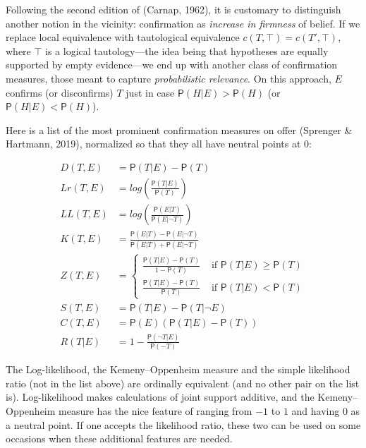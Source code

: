 \documentclass[
  10pt,
  dvipsnames,enabledeprecatedfontcommands]{scrartcl}
\newcommand{\n}{\neg}
\newcommand{\pr}[1]{\mathsf{P}(#1)}
\begin{document}
Following the second edition of (Carnap, 1962), it is customary to
distinguish another notion in the vicinity: confirmation as
\textit{increase in firmness} of belief. If we replace local equivalence
with tautological equivalence \(c(T, \top) = c(T', \top)\), where
\(\top\) is a logical tautology---the idea being that hypotheses are
equally supported by empty evidence---we end up with another class of
confirmation measures, those meant to capture
\emph{probabilistic relevance}. On this approach, \(E\) confirms (or
disconfirms) \(T\) just in case \(\pr{H \vert E} > \pr{H}\) (or
\(\pr{H \vert E} < \pr{H}\)).

Here is a list of the most prominent confirmation measures on offer
(Sprenger \& Hartmann, 2019), normalized so that they all have neutral
points at 0:

\begin{align}
\tag{Difference}  D(T,E) & = \pr{T\vert E} - \pr{T}\\
\tag{Log-ratio}  Lr(T,E) &  = log\left(\frac{\pr{T\vert E}}{\pr{T}} \right) \\
\tag{Log-likelihood}   LL(T,E) & = log\left(\frac{\pr{E \vert T}}{\pr{E \vert \n T}} \right)\\
\tag{Kemeny-Oppenheim}  K(T,E) & = \frac{\pr{E\vert T} - \pr{E \vert \n T}}{\pr{E \vert T} + \pr{E \vert \n T}} \\
\tag{Generalized entailment}  Z(T,E) & = \begin{cases}
\frac{\pr{T\vert E} - \pr{T}}{1-\pr{T}} & \mbox{ if } \pr{T \vert E} \geq \pr{T}\\
\frac{\pr{T\vert E} - \pr{T}}{\pr{T}} & \mbox{ if } \pr{T \vert E} < \pr{T}
\end{cases} \\
\tag{Christensen-Joyce} S(T,E) & = \pr{T \vert E} - \pr{T \vert \n E} \\
\tag{Carnap}  C(T,E) & = \pr{E}(\pr{T\vert E} - \pr{T})\\
\tag{Rips} R(T\vert E) & = 1 - \frac{\pr{\n T\vert E}}{\pr{-T}}
\end{align}

\noindent The Log-likelihood, the Kemeny--Oppenheim measure and the
simple likelihood ratio (not in the list above) are ordinally equivalent
(and no other pair on the list is). Log-likelihood makes calculations of
joint support additive, and the Kemeny--Oppenheim measure has the nice
feature of ranging from \(-1\) to \(1\) and having 0 as a neutral point.
If one accepts the likelihood ratio, these two can be used on some
occasions when these additional features are needed.
\end{document}
